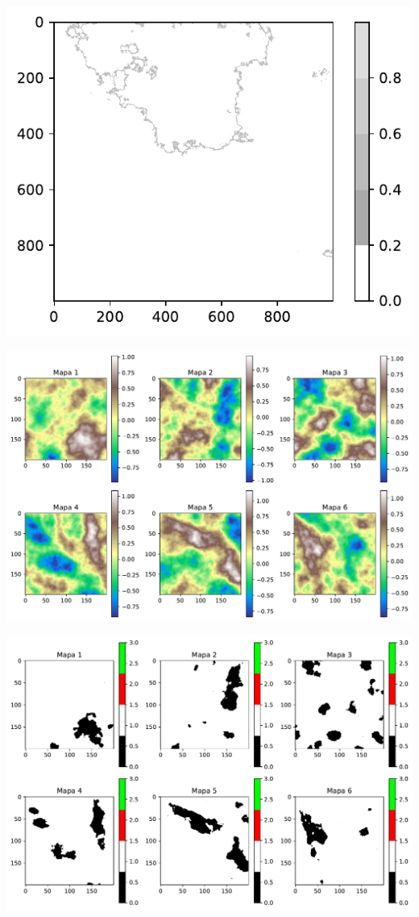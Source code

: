 \documentclass[
  letterpaper,
  DIV=11,
  numbers=noendperiod]{scrartcl}
\begin{document}
\includegraphics{MCA_files/figure-pdf/cell-7-output-1.pdf}

\includegraphics{MCA_files/figure-pdf/cell-8-output-1.pdf}

\includegraphics{MCA_files/figure-pdf/cell-8-output-2.pdf}
\end{document}
